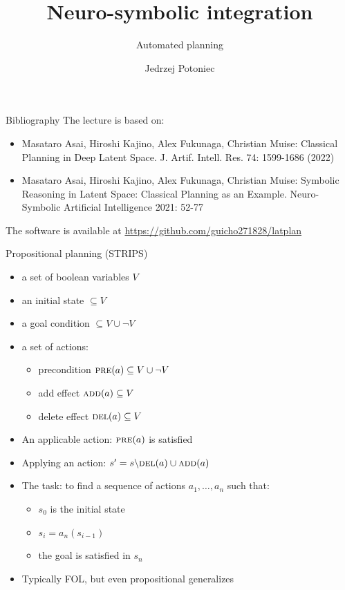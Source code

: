 \documentclass{lecture}
\title{Neuro-symbolic integration}
\subtitle{Automated planning}
\author{Jedrzej Potoniec}
\newcommand{\function}[1]{\textsc{#1}}
\begin{document}
\frame{\titlepage}

\begin{frame}{Bibliography}
    The lecture is based on:
    \begin{itemize}
        \item Masataro Asai, Hiroshi Kajino, Alex Fukunaga, Christian Muise:
        Classical Planning in Deep Latent Space. J. Artif. Intell. Res. 74: 1599-1686 (2022)
        \item Masataro Asai, Hiroshi Kajino, Alex Fukunaga, Christian Muise:
        Symbolic Reasoning in Latent Space: Classical Planning as an Example. Neuro-Symbolic Artificial Intelligence 2021: 52-77        
    \end{itemize}
    
    The software is available at \url{https://github.com/guicho271828/latplan}
\end{frame}

\begin{frame}{Propositional planning (STRIPS)}
    \begin{itemize}
        \item a set of boolean variables $V$
        \item an initial state $\subseteq V$
        \item a goal condition $\subseteq V \cup \lnot V$
        \item a set of actions:
        \begin{itemize}
            \item precondition $\function{pre}(a) \subseteq V \cup \lnot V$
            \item add effect $\function{add}(a) \subseteq V$
            \item delete effect $\function{del}(a) \subseteq V$
        \end{itemize}
        \pause
        \item An applicable action: $\function{pre}(a)$ is satisfied
        \item Applying an action: $s'=s\backslash \function{del}(a) \cup \function{add}(a)$
        \item The task: to find a sequence of actions $a_1, \ldots, a_n$ such that:
        \begin{itemize}
            \item $s_0$ is the initial state
            \item $s_{i}=a_n(s_{i-1})$
            \item the goal is satisfied in $s_n$
        \end{itemize}
        \pause
        \item Typically FOL, but even propositional generalizes
    \end{itemize}
\end{frame}
\end{document}
